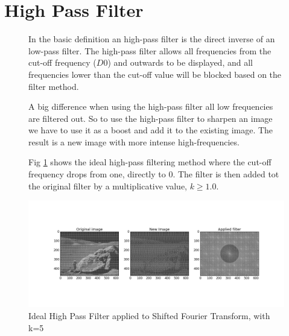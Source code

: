 \section{High Pass Filter}
\begin{figure}[h]
\begin{minipage}{0.57\linewidth}
	In the basic definition an high-pass filter is the direct inverse of an
	low-pass filter.  The high-pass filter allows all frequencies from the cut-off
	frequency ($D0$) and outwards to be displayed, and all frequencies lower than
	the cut-off value will be blocked based on the filter method.

	A big difference when using the high-pass filter all low frequencies are
	filtered out.  So to use the high-pass filter to sharpen an image we have to 
	use it as a boost and add it to the existing image.  The result is a new image
	with more intense high-frequencies.

	Fig \ref{fig:hp_ideal} shows the ideal high-pass filtering method where the
	cut-off frequency drops from one, directly to 0.  The filter is then added tot
	the original filter by a multiplicative value, $k\ge1.0$.
\end{minipage}\hfill
\begin{minipage}{0.4\linewidth}
	\centering
	\includegraphics[width=1\linewidth,clip,trim={650 110 75 110}]{pics/moon_hp_ideal}
	\caption{Ideal High Pass Filter applied to Shifted Fourier Transform, with k=5}
	\label{fig:hp_ideal}
\end{minipage}
\end{figure}


